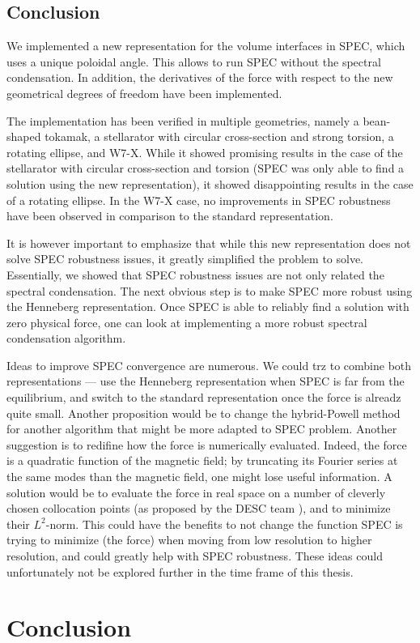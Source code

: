\documentclass[my_thesis.tex]{subfiles}
\begin{document}
\subsection{Conclusion}

We implemented a new representation for the volume interfaces in SPEC, which uses a unique poloidal angle. This allows to run SPEC without the spectral condensation. In addition, the derivatives of the force with respect to the new geometrical degrees of freedom have been implemented.

The implementation has been verified in multiple geometries, namely a bean-shaped tokamak, a stellarator with circular cross-section and strong torsion, a rotating ellipse, and W7-X. While it showed promising results in the case of the stellarator with circular cross-section and torsion (SPEC was only able to find a solution using the new representation), it showed disappointing results in the case of a rotating ellipse. In the W7-X case, no improvements in SPEC robustness have been observed in comparison to the standard representation.

It is however important to emphasize that while this new representation does not solve SPEC robustness issues, it greatly simplified the problem to solve. Essentially, we showed that SPEC robustness issues are not only related the spectral condensation. The next obvious step is to make SPEC more robust using the Henneberg representation. Once SPEC is able to reliably find a solution with zero physical force, one can look at implementing a more robust spectral condensation algorithm.

Ideas to improve SPEC convergence are numerous. We could trz to combine both representations --- use the Henneberg representation when SPEC is far from the equilibrium, and switch to the standard representation once the force is alreadz quite small. Another proposition would be to change the hybrid-Powell method for another algorithm that might be more adapted to SPEC problem. Another suggestion is to redifine how the force is numerically evaluated. Indeed, the force is a quadratic function of the magnetic field; by truncating its Fourier series at the same modes than the magnetic field, one might lose useful information. A solution would be to evaluate the force in real space on a number of cleverly chosen collocation points (as proposed by the DESC team \citep{Dudt2020}), and to minimize their $L^2$-norm. This could have the benefits to not change the function SPEC is trying to minimize (the force) when moving from low resolution to higher resolution, and could greatly help with SPEC robustness. These ideas could unfortunately not be explored further in the time frame of this thesis.

\section{Conclusion \label{sec. chap3 - conclusion}}
\end{document}
